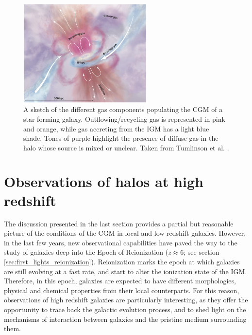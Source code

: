 \begin{figure}
	\centering
	\includegraphics[width=0.6\textwidth]{plots/cgm.PNG}
	\caption{A sketch of the different gas components populating the CGM of a star-forming galaxy. Outflowing/recycling gas is represented in pink and orange, while gas accreting from the IGM has a light blue shade. Tones of purple highlight the presence of diffuse gas in the halo whose source is mixed or unclear. Taken from Tumlinson et al. \citep{tumlison}.
	}
	\label{fig:cgm_cartoon}
    \end{figure}


\section{Observations of halos at high redshift} \label{sec:halo_data}


The discussion presented in the last section provides a partial but reasonable picture of the conditions of the CGM in local and low redshift galaxies. However, in the last few years, new observational capabilities have paved the way to the study of galaxies deep into the Epoch of Reionization ($z\approx6$; see section \ref{sec:first_lights_reionization}). Reionization marks the epoch at which galaxies are still evolving at a fast rate, and start to alter the ionization state of the IGM. Therefore, in this epoch, galaxies are expected to have different morphologies, physical and chemical properties from their local counterparts. For this reason, observations of high redshift galaxies are particularly interesting, as they offer the opportunity to trace back the galactic evolution process, and to shed light on the mechanisms of interaction between galaxies and the pristine medium surrounding them. 


